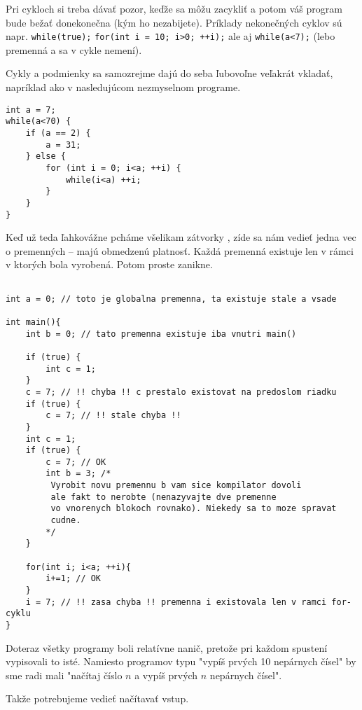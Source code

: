 Pri cykloch si treba dávať pozor, keďže sa môžu zacykliť a potom váš program
bude bežať donekonečna (kým ho nezabijete).  Príklady nekonečných cyklov sú
napr. \verb!while(true);! \verb!for(int i = 10; i>0; ++i);! ale aj
\verb!while(a<7);! (lebo premenná a sa v cykle nemení).

\medskip

Cykly a podmienky sa samozrejme dajú do seba ľubovoľne veľakrát vkladať, napríklad ako v nasledujúcom
nezmyselnom programe.

\begin{lstlisting}
int a = 7;
while(a<70) {
    if (a == 2) {
        a = 31;
    } else {
        for (int i = 0; i<a; ++i) {
            while(i<a) ++i;
        }
    }
}
\end{lstlisting}

\medskip

Keď už teda ľahkovážne pcháme všelikam zátvorky {}, zíde sa nám vedieť jedna vec o premenných
-- majú obmedzenú platnosť. Každá premenná existuje len v rámci ${}$ v ktorých bola vyrobená. 
Potom proste zanikne.

\begin{lstlisting}

int a = 0; // toto je globalna premenna, ta existuje stale a vsade

int main(){
    int b = 0; // tato premenna existuje iba vnutri main()

    if (true) {
        int c = 1;
    }
    c = 7; // !! chyba !! c prestalo existovat na predoslom riadku
    if (true) {
        c = 7; // !! stale chyba !!
    }
    int c = 1;
    if (true) {
        c = 7; // OK
        int b = 3; /*
         Vyrobit novu premennu b vam sice kompilator dovoli
         ale fakt to nerobte (nenazyvajte dve premenne
         vo vnorenych blokoch rovnako). Niekedy sa to moze spravat
         cudne.
        */
    }    

    for(int i; i<a; ++i){
        i+=1; // OK
    }
    i = 7; // !! zasa chyba !! premenna i existovala len v ramci for-cyklu
}

\end{lstlisting}


Doteraz všetky programy boli relatívne nanič, pretože pri každom spustení
vypisovali to isté.  Namiesto programov typu "vypíš prvých 10 nepárnych čísel"
by sme radi mali "načítaj číslo $n$ a vypíš prvých $n$ nepárnych čísel".

Takže potrebujeme vedieť načítavať vstup.

